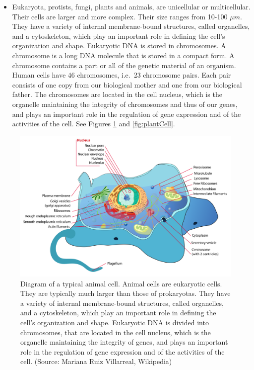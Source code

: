 \documentclass[
  11pt,
]{book}
\providecommand{\tightlist}{%
  \setlength{\itemsep}{0pt}\setlength{\parskip}{0pt}}
\begin{document}
\begin{itemize}
\tightlist
\item
  Eukaryota, protists, fungi, plants and animals, are unicellular or multicellular. Their cells are larger and more complex. Their size ranges from 10-100 \(\mu m\). They have a variety of internal membrane-bound structures, called organelles, and a cytoskeleton, which play an important role in defining the cell's organization and shape. Eukaryotic DNA is stored in chromosomes. A chromosome is a long DNA molecule that is stored in a compact form. A chromosome contains a part or all of the genetic material of an organism. Human cells have 46 chromosomes, i.e.~23 chromosome pairs. Each pair consists of one copy from our biological mother and one from our biological father. The chromosomes are located in the cell nucleus, which is the organelle maintaining the integrity of chromosomes and thus of our genes, and plays an important role in the regulation of gene expression and of the activities of the cell. See Figures \ref{fig:animalCell} and \ref{fig:plantCell}.
\end{itemize}

\begin{figure}

{\centering \includegraphics[width=0.5\linewidth]{./figs/animalCell} 

}

\caption{Diagram of a typical animal cell. Animal cells are eukaryotic cells. They are typically much larger than those of prokaryotas. They have a variety of internal membrane-bound structures, called organelles, and a cytoskeleton, which play an important role in defining the cell's organization and shape. Eukaryotic DNA is divided into chromosomes, that are located in the cell nucleus, which is the organelle maintaining the integrity of genes, and plays an important role in the regulation of gene expression and of the activities of the cell. (Source: Mariana Ruiz Villarreal, Wikipedia)}\label{fig:animalCell}
\end{figure}
\end{document}
